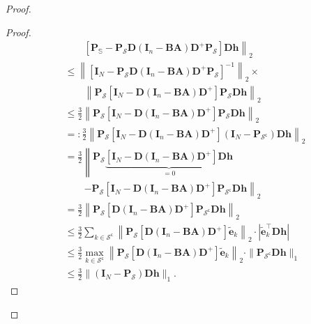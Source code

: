 \begin{proof}
{\begin{proof}
{\begin{align*}
                    & \qquad \left. \left [ \mathbf{P}_\mathbb{S} - \mathbf{P}_\mathcal{S} \mathbf{D} (\mathbf{I}_n - \mathbf{B A}) \mathbf{D}^+ \mathbf{P}_\mathcal{S} \right ] \mathbf{Dh}\right \|_2 \\
                    & \leq \left \| \left [ \mathbf{I}_N - \mathbf{P}_\mathcal{S} \mathbf{D} (\mathbf{I}_n - \mathbf{B A}) \mathbf{D}^+ \mathbf{P}_\mathcal{S} \right ]^{-1} \right \|_2 \times \\
                    & \qquad \left \| \mathbf{P}_\mathcal{S} \left [ \mathbf{I}_N - \mathbf{D}(\mathbf{I}_n - \mathbf{B A}) \mathbf{D}^+ \right ] \mathbf{P}_\mathcal{S} \mathbf{D h}\right \|_2 \\
                    & \leq \frac{3}{2} \left \| \mathbf{P}_\mathcal{S} \left [ \mathbf{I}_N - \mathbf{D}(\mathbf{I}_n - \mathbf{B A}) \mathbf{D}^+ \right ] \mathbf{P}_\mathcal{S} \mathbf{D h} \right \|_2 \\
                    & =: \frac{3}{2} \left \| \mathbf{P}_\mathcal{S} \left [ \mathbf{I}_N - \mathbf{D}(\mathbf{I}_n - \mathbf{B A}) \mathbf{D}^+ \right ] (\mathbf{I}_N - \mathbf{P}_{\mathcal{S}^{\mathsf{c}}}) \mathbf{D h}\right \|_2 \\
                    & = \frac{3}{2} \left \| \mathbf{P}_\mathcal{S} \underbrace{\left [ \mathbf{I}_N - \mathbf{D}(\mathbf{I}_n - \mathbf{B A}) \mathbf{D}^+ \right ] \mathbf{D h}}_{=0} \right. \\
                    & \qquad \left. - \mathbf{P}_\mathcal{S} \left [ \mathbf{I}_N - \mathbf{D}(\mathbf{I}_n - \mathbf{B A}) \mathbf{D}^+ \right ] \mathbf{P}_{\mathcal{S}^{\mathsf{c}}} \mathbf{D h} \right \|_2 \\
                    & = \frac{3}{2} \left \| \mathbf{P}_\mathcal{S} \left [ \mathbf{D}(\mathbf{I}_n - \mathbf{B A}) \mathbf{D}^+ \right ] \mathbf{P}_{\mathcal{S}^{\mathsf{c}}} \mathbf{D h} \right \|_2 \\
                    & \leq \frac{3}{2} \sum_{k \in \mathcal{S}^{\mathsf{c}}} \left \| \mathbf{P}_\mathcal{S} \left [ \mathbf{D}(\mathbf{I}_n - \mathbf{B A}) \mathbf{D}^+ \right ] \mathbf{\tilde{e}}_k \right \|_2 \cdot |\mathbf{\tilde{e}}_k ^\top \mathbf{D h} | \\
                    & \leq \frac{3}{2} \underset{k \in \mathcal{S}^{\mathsf{c}}}{\max} \left \| \mathbf{P}_\mathcal{S} \left [ \mathbf{D}(\mathbf{I}_n - \mathbf{B A}) \mathbf{D}^+ \right ] \mathbf{\tilde{e}}_k \right \|_2 \cdot \|\mathbf{P}_{\mathcal{S}^{\mathsf{c}}} \mathbf{D h}\|_1 \\
                    & \leq \frac{3}{2} \|(\mathbf{I}_N - \mathbf{P}_\mathcal{S}) \mathbf{D h}\|_1.
                \end{align*}
            }
            \qedsymbol
        \end{proof}
    }


\end{proof}
